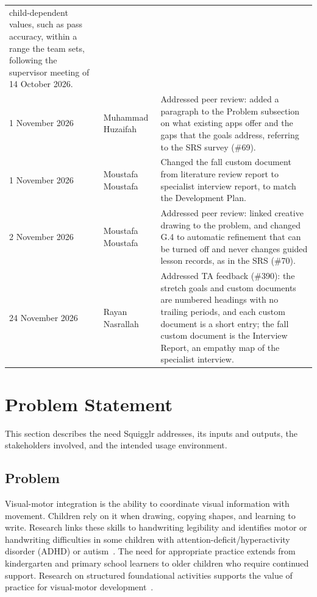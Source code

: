 \documentclass{article}
\begin{document}
\begin{table}[hp]
\begin{tabularx}{\textwidth}{llX}
child-dependent values, such as pass accuracy, within a range the team
sets, following the supervisor meeting of 14 October 2026.\\
1 November 2026 & Muhammad Huzaifah & Addressed peer review: added a
paragraph to the Problem subsection on what existing apps offer and the gaps
that the goals address, referring to the SRS survey (\#69).\\
1 November 2026 & Moustafa Moustafa & Changed the fall custom document from
literature review report to specialist interview report, to match the
Development Plan.\\
2 November 2026 & Moustafa Moustafa & Addressed peer review: linked creative
drawing to the problem, and changed G.4 to automatic refinement that can be
turned off and never changes guided lesson records, as in the SRS (\#70).\\
24 November 2026 & Rayan Nasrallah & Addressed TA feedback (\#390): the stretch
goals and custom documents are numbered headings with no trailing periods, and
each custom document is a short entry; the fall custom document is the
Interview Report, an empathy map of the specialist interview.\\
\bottomrule
\end{tabularx}
\end{table}

\clearpage

\section{Problem Statement}

This section describes the need Squigglr addresses, its inputs and
outputs, the stakeholders involved, and the intended usage environment.

\subsection{Problem}

Visual-motor integration is the ability to coordinate visual information
with movement. Children rely on it when drawing, copying shapes, and
learning to write. Research links these skills to handwriting legibility
and identifies motor or handwriting difficulties in some children with
attention-deficit/hyperactivity disorder (ADHD) or
autism~\cite{daly2003,kaiser2015,fuentes2009}.
The need for appropriate practice extends from kindergarten and primary
school learners to older children who require continued support.
Research on structured foundational activities supports the value of
practice for visual-motor development~\cite{taverna2020}.
\end{document}
